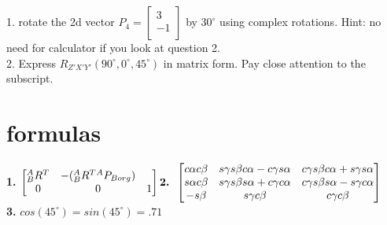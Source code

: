 \documentclass{article}
\begin{document}
\section{}
1. rotate the 2d vector $P_{4}=\begin{bmatrix}
3  \\
-1 \\
\end{bmatrix}$ by $30^{\circ}$ using complex rotations. Hint: no need for calculator if you look at question 2.\\
2. Express $R_{Z'X'Y'}(90^\circ,0^\circ,45^\circ)$ in matrix form. Pay close attention to the subscript.  \\

\newpage
\section{formulas}
\textbf{1. } $\begin{bmatrix}
{}^{A}_{B}R^T & -({}^{A}_{B}R^T{}^{A}P_{Borg})\\
0 & 0 & 1
\end{bmatrix}\\
\textbf{2. } \begin{bmatrix}
c\alpha c\beta & s\gamma s\beta c\alpha - c\gamma s\alpha & c\gamma s\beta c\alpha + s\gamma s\alpha\\
s\alpha c\beta & s\gamma s\beta s\alpha + c\gamma c\alpha & c\gamma s\beta s\alpha - s\gamma c\alpha \\
-s\beta & s\gamma c\beta & c\gamma c\beta
\end{bmatrix}$\\
\textbf{3. }$cos(45^\circ)=sin(45^\circ)=.71$
\end{document}
